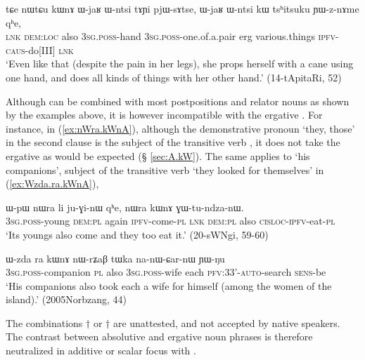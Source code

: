     \begin{exe}
\ex \label{ex:nWtCu.kWnA}
\gll    tɕe nɯtɕu kɯnɤ ɯ-jaʁ ɯ-ntsi tɤɲi pjɯ-sɤtse, ɯ-jaʁ ɯ-ntsi kɯ tsʰitsuku ɲɯ-z-nɤme qʰe, \\
\textsc{lnk} \textsc{dem}:\textsc{loc} also \textsc{3sg}.\textsc{poss}-hand \textsc{3sg}.\textsc{poss}-one.of.a.pair erg various.things \textsc{ipfv}-\textsc{caus}-do[III] \textsc{lnk}  \\
\glt `Even like that (despite the pain in her legs), she props herself with a cane using one hand, and does all kinds of things with her other hand.' (14-tApitaRi, 52)
\end{exe}

Although  can be combined with most postpositions and relator nouns as shown by the examples above, it is however incompatible with the ergative . For instance, in  (\ref{ex:nWra.kWnA}), although the demonstrative pronoun  `they, those' in the second clause is the subject of the transitive verb , it does not take the ergative  as would be expected (§ \ref{sec:A.kW}). The same applies to  `his companions', subject of the transitive verb  `they looked for themselves' in (\ref{ex:Wzda.ra.kWnA}), 

  \begin{exe}
\ex \label{ex:nWra.kWnA}
\gll ɯ-pɯ nɯra li ju-ɣi-nɯ qʰe, nɯra kɯnɤ ɣɯ-tu-ndza-nɯ. \\
\textsc{3sg}.\textsc{poss}-young \textsc{dem}:\textsc{pl} again \textsc{ipfv}-come-\textsc{pl} \textsc{lnk} \textsc{dem}:\textsc{pl} also \textsc{cisloc}-\textsc{ipfv}-eat-\textsc{pl} \\
\glt `Its youngs also come and they too eat it.' (20-sWNgi, 59-60)
  \end{exe}
  
    \begin{exe}
\ex \label{ex:Wzda.ra.kWnA}
\gll   ɯ-zda ra kɯnɤ nɯ-rʑaβ tɯka na-nɯ-ɕar-nɯ ɲɯ-ŋu \\
\textsc{3sg}.\textsc{poss}-companion \textsc{pl} also \textsc{3sg}.\textsc{poss}-wife each \textsc{pfv}:3\fl{}3'-\textsc{auto}-search \textsc{sens}-be \\
\glt `His companions also took each a wife for himself (among the women of the island).' (2005Norbzang, 44)
    \end{exe}
    
The combinations $\dagger$ or $\dagger$ are unattested, and not accepted by native speakers. The contrast between absolutive and ergative noun phrases is therefore neutralized in additive or scalar focus with .

